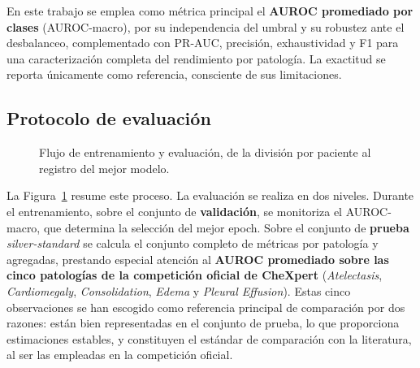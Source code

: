 En este trabajo se emplea como métrica principal el \textbf{AUROC promediado por
clases} (AUROC-macro), por su independencia del umbral y su robustez ante el
desbalanceo, complementado con PR-AUC, precisión, exhaustividad y F1 para una
caracterización completa del rendimiento por patología. La exactitud se reporta
únicamente como referencia, consciente de sus limitaciones.

\subsection{Protocolo de evaluación}

\begin{figure}[ht]
\centering
{}
\caption{Flujo de entrenamiento y evaluación, de la división por paciente al registro
del mejor modelo.}
\label{fig::mm_train_eval}
\end{figure}

La Figura~\ref{fig::mm_train_eval} resume este proceso. La evaluación se realiza en dos
niveles. Durante el entrenamiento, sobre el
conjunto de \textbf{validación}, se monitoriza el AUROC-macro, que determina la
selección del mejor epoch. Sobre el conjunto de \textbf{prueba}
\textit{silver-standard} se calcula el conjunto completo de métricas por patología
y agregadas, prestando especial atención al \textbf{AUROC promediado sobre las
cinco patologías de la competición oficial de CheXpert} (\textit{Atelectasis},
\textit{Cardiomegaly}, \textit{Consolidation}, \textit{Edema} y \textit{Pleural
Effusion}). Estas cinco observaciones se han escogido como referencia principal de
comparación por dos razones: están bien representadas en el conjunto de prueba,
lo que proporciona estimaciones estables, y constituyen el estándar de
comparación con la literatura, al ser las empleadas en la competición oficial.

